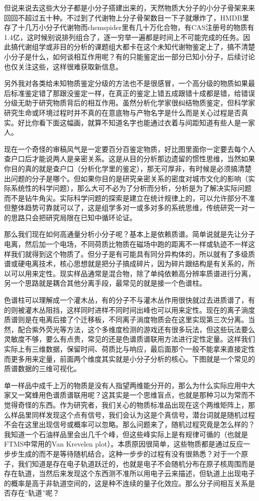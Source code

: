\documentclass[
]{book}
\begin{document}
但说来说去这些大分子都是小分子搭建出来的，天然物质大分子的小分子骨架来来回回不超过五十种。不过到了代谢物上分子骨架数目一下子就爆炸了，HMDB里存了十几万小分子代谢物而chemspider里有几十万化合物，有CAS注册号的物质有1.4亿，这时候别说排列组合了，逐一穷举一遍都是时间上不可能完成的任务。因此搞代谢组学或非目的分析的课题组大都卡在这个未知代谢物鉴定上了，搞不清楚小分子是什么，如何谈相互作用呢？有的只能鉴定出一部分已知小分子，后续讨论也仅关注这些，这样很难获取新信息。

另外我对各类给未知物质鉴定分级的方法也不是很感冒，一个高分级的物质如果最后标准鉴定错了那跟没鉴定一样，在真正的鉴定上错五成跟错十成都是错，给错误分级无助于研究物质背后的相互作用。虽然分析化学家很纠结物质鉴定，但科学家研究生命或环境过程时并不真的在意底物与产物名字是什么而是关心过程是否真实。好比你看下面这幅画，就算不知道名字也能通过衣着与间距知道有些人是一家人。

现在一个奇怪的审稿风气是一定要百分百鉴定物质，好比图里面你一定要去每个人查户口后才能说两人是亲密关系。这是从目的分析那边遗留的惯性思维，当然如果你目的真的就是查户口（分析化学里的鉴定），那无可厚非，有时候是必须搞清楚出问题的分子是哪个。但如果你目的是研究亲密关系的密度对城市文化的影响（实际系统性的科学问题），那么大可不必为了分析而分析，分析是为了解决实际问题而不是钻牛角尖。实际科学问题的探索是建立在统计规律上的，可以允许部分不准但整体趋势可靠就可以了，这是组学多对一或多对多的系统思维，传统研究一对一的思路只会把研究局限在已知中循环论证。

那么我们现在如何高通量分析小分子呢？基本上是依赖质谱。简单说就是先让分子电离，然后加一个电场，不同荷质比物质在磁场中跑的距离不一样或轨迹不一样这样我们就得到这个物质了。但分子是有可能具有同分异构体的，所以就有了多级质谱或硬电离技术，核心思想就是把分子搞成碎片，因为碎片跟结构是有关系的，所以可以用来定性。现实样品通常是混合物，除了单纯依赖高分辨率质谱进行分离，另一个思路就是耦合其他分离手段，最常见的就是接一个色谱柱。

色谱柱可以理解成一个灌木丛，有的分子不与灌木丛作用很快就过去进质谱了，有的则被灌木丛阻挡，这样同时进样不同时间出峰也可以用来定性。现在的离子淌度质谱则是在电离后接了个迁移板，不同离子淌度物质会在这里实现第三次分离。当然，配合紫外荧光等方法，这个多维度检测的游戏还有很多玩法，但这些玩法要么灵敏度不够，要么有点贵，常见的还是色谱质谱联用方法进行定性定量。这样我们实际上有三维数据，保留时间、荷质比与响应，最后面那个一般不能拿来直接定性而更多用来定量，前面两个维度其实就是小分子分析的核心。下图就是一个常见的质谱数据的三维可视化。

单一样品中成千上万的物质是没有人指望两维能分开的，那么为什么实际应用中大家又一窝蜂用色谱质谱联用呢？这其实是一个思维盲点，也就是那种习以为常而不觉得奇怪的东西。作为研究者，我们关心的物质标准品出现在这个两维矩阵上，那么样品里同样发现这个点有信号，我们会认为这是个真信号，潜台词就是随机过程不会在这里出现信号或概率可以忽略。那么问题来了，随机过程究竟是怎么样的？我知道一个石油样品里会出几千个峰，但这些峰实际上是有规律可循的（也就是FTMS中常用的Van Krevelen plot）。本质原因很简单，这些物质都是通过反应一步步生成的而不是等待随机结合。这种一步步的过程有没有很熟悉？对于一个原子，我们知道是存在电子轨道跃迁的，也就是电子不会随机分布在原子核周围而是存在轨道，当然后来发现这个东西测不准所以用电子云来描述，但轨道上出现电子的概率是高于非轨道空间的，这是种不连续的量子化效应。那么分子间相互关系是否存在``轨道''呢？
\end{document}
